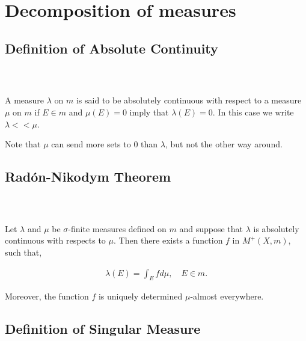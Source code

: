 \documentclass{beamer}
\numberwithin{equation}{section}
\begin{document}
\section{Decomposition of measures}

\subsection{Definition of Absolute Continuity}

\begin{frame}\frametitle{{\normalsize \secname} \\ {\large \subsecname}}
    \begin{definition}
        A measure $\lambda$ on $m$ is said to be absolutely continuous with respect to a measure $\mu$ on $m$ if $E \in m$ and $\mu(E) = 0$ imply that $\lambda (E) = 0$.
        In this case we write $\lambda << \mu$.
    \end{definition}

    Note that $\mu$ can send more sets to 0 than $\lambda$, but not the other way around.
\end{frame}

\subsection{Radón-Nikodym Theorem}

\begin{frame}\frametitle{{\normalsize \secname} \\ {\large \subsecname}}
    \begin{theorem}
        Let $\lambda$ and $\mu$ be $\sigma$-finite measures defined on $m$ and suppose that $\lambda$ is absolutely continuous with respects to $\mu$.
        Then there exists a function $f$ in $M^+(X, m)$, such that,
    
        \begin{align}
            \lambda(E) = \int_E f d\mu, \quad E \in m.
        \end{align}
    
        Moreover, the function $f$ is uniquely determined $\mu$-almost everywhere.
    \end{theorem}
\end{frame}

\subsection{Definition of Singular Measure}
\end{document}
